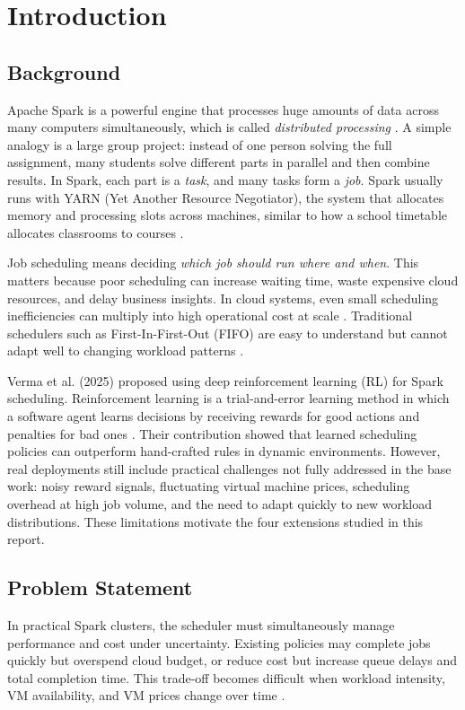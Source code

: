 \chapter{Introduction}
\label{chap:introduction}

\section{Background}
Apache Spark is a powerful engine that processes huge amounts of data across many computers simultaneously, which is called \emph{distributed processing} \cite{zaharia2016spark}. A simple analogy is a large group project: instead of one person solving the full assignment, many students solve different parts in parallel and then combine results. In Spark, each part is a \emph{task}, and many tasks form a \emph{job}. Spark usually runs with YARN (Yet Another Resource Negotiator), the system that allocates memory and processing slots across machines, similar to how a school timetable allocates classrooms to courses \cite{vavilapalli2013apache}.

Job scheduling means deciding \emph{which job should run where and when}. This matters because poor scheduling can increase waiting time, waste expensive cloud resources, and delay business insights. In cloud systems, even small scheduling inefficiencies can multiply into high operational cost at scale \cite{mao2016resource}. Traditional schedulers such as First-In-First-Out (FIFO) are easy to understand but cannot adapt well to changing workload patterns \cite{schedsurvey2016}.

Verma et al. (2025) proposed using deep reinforcement learning (RL) for Spark scheduling. Reinforcement learning is a trial-and-error learning method in which a software agent learns decisions by receiving rewards for good actions and penalties for bad ones \cite{sutton2018rl}. Their contribution showed that learned scheduling policies can outperform hand-crafted rules in dynamic environments. However, real deployments still include practical challenges not fully addressed in the base work: noisy reward signals, fluctuating virtual machine prices, scheduling overhead at high job volume, and the need to adapt quickly to new workload distributions. These limitations motivate the four extensions studied in this report.

\section{Problem Statement}
In practical Spark clusters, the scheduler must simultaneously manage performance and cost under uncertainty. Existing policies may complete jobs quickly but overspend cloud budget, or reduce cost but increase queue delays and total completion time. This trade-off becomes difficult when workload intensity, VM availability, and VM prices change over time \cite{spot2013deconstructing}.

